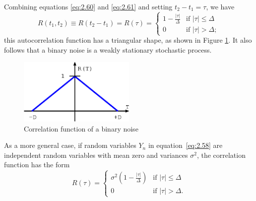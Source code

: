 \documentclass[12pt,letterpaper]{article}
\begin{document}
Combining equations \eqref{eq:2.60} and \eqref{eq:2.61} and setting $t_2 - t_1 = \tau$, we have
\begin{equation}
R(t_1, t_2) \equiv R(t_2 - t_1) = R(\tau) =
\begin{cases}
1- \frac{|\tau|}{\Delta} & \text{if } |\tau| \leq \Delta \\ 
0                        & \text{if } |\tau| > \Delta;
\end{cases}
\end{equation}
this autocorrelation function has a triangular shape, as shown in Figure \ref{fig:correlation_binary_noise}. It also follows that a binary noise is a weakly stationary stochastic process. 
\begin{figure}
\centering
{}
\includegraphics[width=0.5\textwidth]{correlation_binary_noise.eps}
\caption{Correlation function of a binary noise}
\label{fig:correlation_binary_noise}
\end{figure}

As a more general case, if random variables $Y_n$ in equation~\eqref{eq:2.58} are independent random variables with mean zero and variances $\sigma^2$, the correlation function has the form 
\begin{equation}
R(\tau) =
\begin{cases}
\sigma^2\left(1- \frac{|\tau|}{\Delta}\right) & \text{if } |\tau| \leq \Delta \\ 
0                                             & \text{if } |\tau| > \Delta.
\end{cases}
\end{equation}
\end{document}
